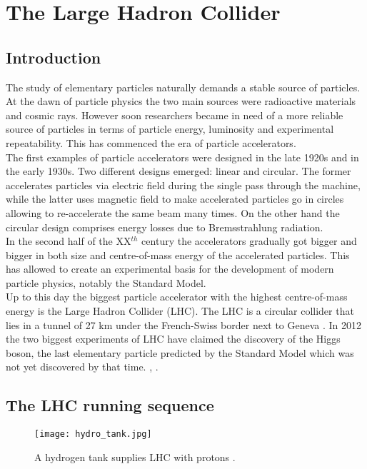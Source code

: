\chapter{The Large Hadron Collider}
        
    \section{Introduction}
    
        The study of elementary particles naturally demands a stable source of particles. At the dawn of particle physics the two main sources were radioactive materials and cosmic rays. However soon researchers became in need of a more reliable source of particles in terms of particle energy, luminosity and experimental repeatability. This has commenced the era of particle accelerators.\\
        The first examples of particle accelerators were designed in the late 1920s and in the early 1930s. Two different designs emerged: linear and circular. The former accelerates particles via electric field during the single pass through the machine, while the latter uses magnetic field to make accelerated particles go in circles allowing to re-accelerate the same beam many times. On the other hand the circular design comprises energy losses due to Bremsstrahlung radiation.\\
        In the second half of the XX$^{th}$ century the accelerators gradually got bigger and bigger in both size and centre-of-mass energy of the accelerated particles. This has allowed to create an experimental basis for the development of modern particle physics, notably the Standard Model.\\
        Up to this day the biggest particle accelerator with the highest centre-of-mass energy is the Large Hadron Collider (LHC). The LHC is a circular collider that lies in a tunnel of 27 km under the French-Swiss border next to Geneva \cite{Bruning:2668521}. In 2012 the two biggest experiments of LHC have claimed the discovery of the Higgs boson, the last elementary particle predicted by the Standard Model which was not yet discovered by that time. \cite{higgs_atlas}, \cite{higgs_cms}.
        
        \section{The LHC running sequence}
                   \begin{figure}[htpb]
        	\texttt{[image: hydro\_tank.jpg]}
        	\caption{A hydrogen tank supplies LHC with protons \cite{hydro}.}
        	\label{fig::hydro}
        \end{figure}
        	
